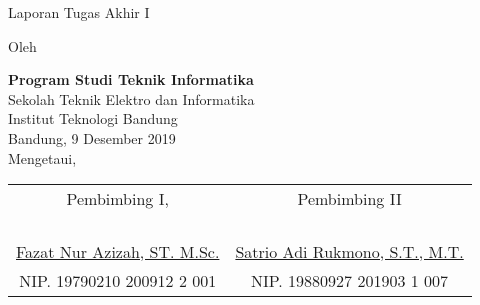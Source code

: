 \clearpage
\pagestyle{empty}

\begin{center}
\smallskip

    \Large \bfseries \MakeUppercase{\thetitle}
    \vfill

    \Large Laporan Tugas Akhir I
    \vfill

    \large Oleh

    \Large \theauthor

    \normalsize
    \textbf{Program Studi Teknik Informatika} \\
    Sekolah Teknik Elektro dan Informatika \\
    Institut Teknologi Bandung \\

    \vfill
    \normalsize \normalfont
    Bandung, 9 Desember 2019 \\
    Mengetaui,

    \vfill
    \setlength{\tabcolsep}{12pt}
    \begin{tabular}{c@{\hskip 0.5in}c}
        Pembimbing I, & Pembimbing II \\
        & \\
        & \\
        & \\
        & \\
        \underline{Fazat Nur Azizah, ST. M.Sc.} & \underline{Satrio Adi Rukmono, S.T., M.T.} \\
        NIP. 19790210 200912 2 001 & NIP. 19880927 201903 1 007 \\
    \end{tabular}

\end{center}
\clearpage
